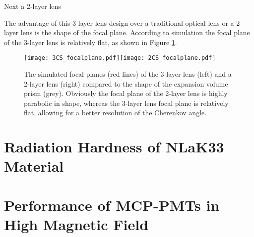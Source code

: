 Next a 2-layer lens

The advantage of this 3-layer lens design over a traditional optical lens or a 2-layer lens is the shape of the focal plane. According to simulation the focal plane of the 3-layer lens is relatively flat, as shown in Figure \ref{fig:lens_focal_plane}. 

\begin{figure}[ht]
	\centering
	\texttt{[image: 3CS\_focalplane.pdf]}\texttt{[image: 2CS\_focalplane.pdf]}
	\caption{The simulated focal planes (red lines) of the 3-layer lens (left) and a 2-layer lens (right) compared to the shape of the expansion volume prism (grey). Obviously the focal plane of the 2-layer lens is highly parabolic in shape, whereas the 3-layer lens focal plane is relatively flat, allowing for a better resolution of the Cherenkov angle.}
	\label{fig:lens_focal_plane}
\end{figure}

\section{Radiation Hardness of NLaK33 Material}

\section{Performance of MCP-PMTs in High Magnetic Field}